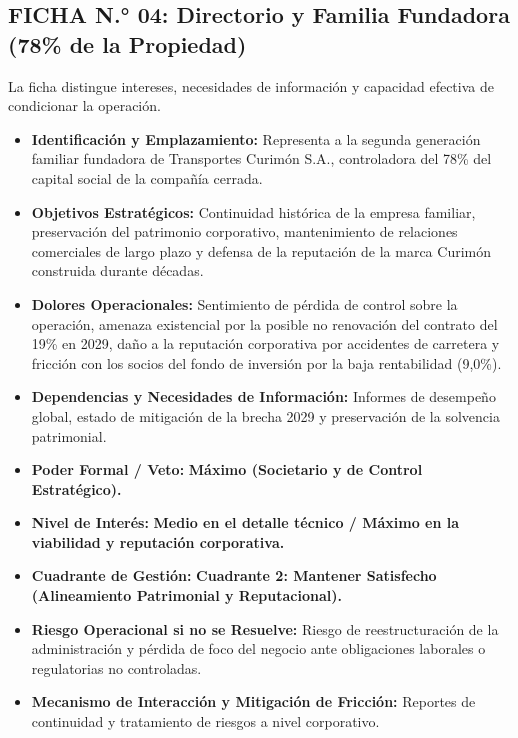 \subsection*{FICHA N.° 04: Directorio y Familia Fundadora (78\% de la Propiedad)}
La ficha distingue intereses, necesidades de información y capacidad efectiva de condicionar la operación.
\begin{itemize}
\item \textbf{Identificación y Emplazamiento:} Representa a la segunda generación familiar fundadora de Transportes Curimón S.A., controladora del 78\% del capital social de la compañía cerrada.
\item \textbf{Objetivos Estratégicos:} Continuidad histórica de la empresa familiar, preservación del patrimonio corporativo, mantenimiento de relaciones comerciales de largo plazo y defensa de la reputación de la marca Curimón construida durante décadas.
\item \textbf{Dolores Operacionales:} Sentimiento de pérdida de control sobre la operación, amenaza existencial por la posible no renovación del contrato del 19\% en 2029, daño a la reputación corporativa por accidentes de carretera y fricción con los socios del fondo de inversión por la baja rentabilidad (9,0\%).
\item \textbf{Dependencias y Necesidades de Información:} Informes de desempeño global, estado de mitigación de la brecha 2029 y preservación de la solvencia patrimonial.
\item \textbf{Poder Formal / Veto:} \textbf{Máximo (Societario y de Control Estratégico).}
\item \textbf{Nivel de Interés:} \textbf{Medio en el detalle técnico / Máximo en la viabilidad y reputación corporativa.}
\item \textbf{Cuadrante de Gestión:} \textbf{Cuadrante 2: Mantener Satisfecho (Alineamiento Patrimonial y Reputacional).}
\item \textbf{Riesgo Operacional si no se Resuelve:} Riesgo de reestructuración de la administración y pérdida de foco del negocio ante obligaciones laborales o regulatorias no controladas.
\item \textbf{Mecanismo de Interacción y Mitigación de Fricción:} Reportes de continuidad y tratamiento de riesgos a nivel corporativo.
\end{itemize}
